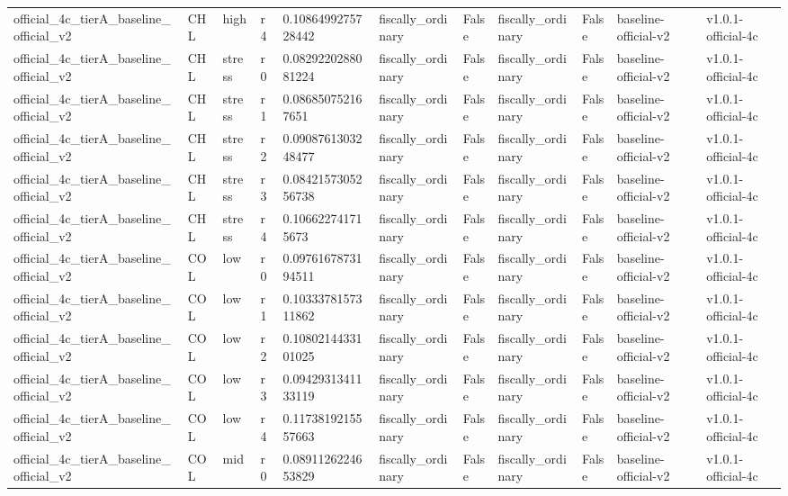 \begin{table}[!htbp]
\begin{tabular}{lllllllllll}
official\_4c\_tierA\_baseline\_official\_v2 & CHL & high & r4 & 0.1086499275728442 & fiscally\_ordinary & False & fiscally\_ordinary & False & baseline-official-v2 & v1.0.1-official-4c \\
official\_4c\_tierA\_baseline\_official\_v2 & CHL & stress & r0 & 0.0829220288081224 & fiscally\_ordinary & False & fiscally\_ordinary & False & baseline-official-v2 & v1.0.1-official-4c \\
official\_4c\_tierA\_baseline\_official\_v2 & CHL & stress & r1 & 0.086850752167651 & fiscally\_ordinary & False & fiscally\_ordinary & False & baseline-official-v2 & v1.0.1-official-4c \\
official\_4c\_tierA\_baseline\_official\_v2 & CHL & stress & r2 & 0.0908761303248477 & fiscally\_ordinary & False & fiscally\_ordinary & False & baseline-official-v2 & v1.0.1-official-4c \\
official\_4c\_tierA\_baseline\_official\_v2 & CHL & stress & r3 & 0.0842157305256738 & fiscally\_ordinary & False & fiscally\_ordinary & False & baseline-official-v2 & v1.0.1-official-4c \\
official\_4c\_tierA\_baseline\_official\_v2 & CHL & stress & r4 & 0.106622741715673 & fiscally\_ordinary & False & fiscally\_ordinary & False & baseline-official-v2 & v1.0.1-official-4c \\
official\_4c\_tierA\_baseline\_official\_v2 & COL & low & r0 & 0.0976167873194511 & fiscally\_ordinary & False & fiscally\_ordinary & False & baseline-official-v2 & v1.0.1-official-4c \\
official\_4c\_tierA\_baseline\_official\_v2 & COL & low & r1 & 0.1033378157311862 & fiscally\_ordinary & False & fiscally\_ordinary & False & baseline-official-v2 & v1.0.1-official-4c \\
official\_4c\_tierA\_baseline\_official\_v2 & COL & low & r2 & 0.1080214433101025 & fiscally\_ordinary & False & fiscally\_ordinary & False & baseline-official-v2 & v1.0.1-official-4c \\
official\_4c\_tierA\_baseline\_official\_v2 & COL & low & r3 & 0.0942931341133119 & fiscally\_ordinary & False & fiscally\_ordinary & False & baseline-official-v2 & v1.0.1-official-4c \\
official\_4c\_tierA\_baseline\_official\_v2 & COL & low & r4 & 0.1173819215557663 & fiscally\_ordinary & False & fiscally\_ordinary & False & baseline-official-v2 & v1.0.1-official-4c \\
official\_4c\_tierA\_baseline\_official\_v2 & COL & mid & r0 & 0.0891126224653829 & fiscally\_ordinary & False & fiscally\_ordinary & False & baseline-official-v2 & v1.0.1-official-4c \\

\end{tabular}
\end{table}
